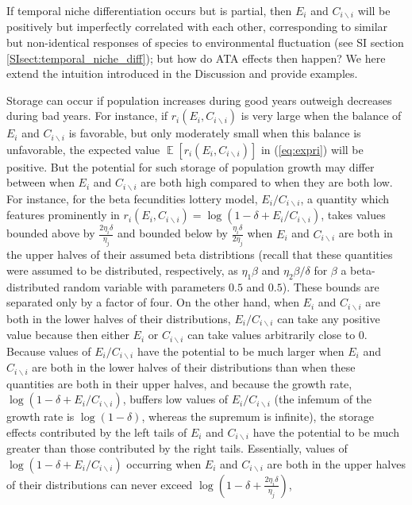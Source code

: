 \documentclass[letterpaper,11pt]{article}
\DeclareMathOperator{\E}{\mathbb{E}}%
\newcommand{\bs}{\backslash}
\begin{document}
If temporal niche differentiation occurs but is partial, 
then $E_i$ and $C_{i \bs i}$ will be positively but imperfectly correlated with
each other, corresponding to similar but non-identical responses of species to
environmental fluctuation (see SI section \ref{SIsect:temporal_niche_diff}); 
but how do ATA effects then happen? We here extend the intuition
introduced in the Discussion and provide examples. 

Storage can occur if population
increases during good years outweigh decreases during bad years. For instance,
if $r_i(E_i,C_{i \bs i})$ is very large when the balance of $E_i$ and 
$C_{i \bs i}$ is favorable, but only moderately small when this balance is
unfavorable, the expected value $\E[r_i(E_i,C_{i \bs i})]$ in (\ref{eq:expri})
will be positive. But the potential for such storage of population growth
may differ between when $E_i$ and $C_{i \bs i}$ are both high compared
to when they are both low. 
For instance, for the beta fecundities lottery model, $E_i/C_{i \bs i}$, a quantity
which features prominently in $r_i(E_i,C_{i \bs i})=\log(1-\delta+E_i/C_{i \bs i})$,
takes values bounded above by $\frac{2\eta_i \delta}{\eta_j}$ 
and bounded below by $\frac{\eta_i \delta}{2 \eta_j}$ when $E_i$ and $C_{i \bs i}$
are both in the upper halves of their assumed beta distribtions (recall that 
these quantities were assumed to be distributed, respectively, as $\eta_1 \beta$
and $\eta_2 \beta/\delta$ for $\beta$ a beta-distributed random variable with parameters 
$0.5$ and $0.5$). These bounds are separated only by a factor of four. 
On the other hand, when $E_i$ and $C_{i \bs i}$ are both in the lower halves 
of their distributions, $E_i/C_{i \bs i}$ can take any positive value because
then either $E_i$ or $C_{i \bs i}$ can take values arbitrarily close to $0$. 
Because values of $E_i/C_{i \bs i}$ have the potential to be much larger when 
$E_i$ and $C_{i \bs i}$ are both in the lower halves of their distributions
than when these quantities are both in their upper halves, and because
the growth rate, $\log(1-\delta+E_i/C_{i \bs i})$, buffers low values of 
$E_i/C_{i \bs i}$ (the infemum of the growth rate is $\log(1-\delta)$, whereas the supremum is
infinite), the storage effects contributed by the left tails of 
$E_i$ and $C_{i \bs i}$ have the potential to be much greater than those contributed
by the right tails. Essentially, values of $\log(1-\delta+E_i/C_{i \bs i})$
occurring when $E_i$ and $C_{i \bs i}$ are both in the upper halves of their
distributions can never exceed $\log(1-\delta+\frac{2\eta_i \delta}{\eta_j})$,
\end{document}
